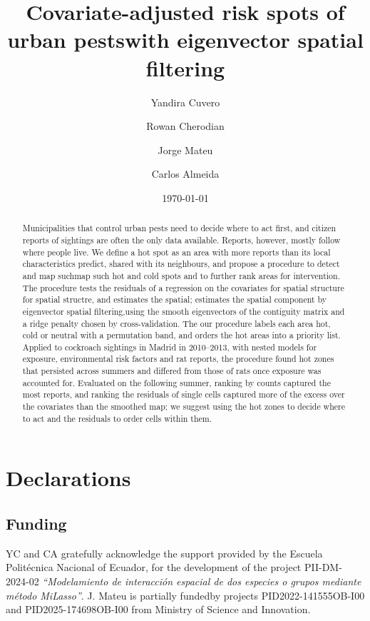 \documentclass[12pt, a4paper]{article}
\title{Covariate-adjusted risk spots of urban pestswith eigenvector spatial filtering}
\date{\today}
\author[1,2]{Yandira Cuvero}
\author[3]{Rowan Cherodian}
\author[1]{Jorge Mateu}
\author[2]{Carlos Almeida}
\affil[1]{Department of Mathematics, Universidad Jaume I, Castellón, Spain}
\affil[2]{Department of Mathematics, Escuela Politécnica Nacional, Quito, Ecuador}
\affil[3]{School of Medicine and Population Health, University of Sheffield, UK}
\begin{document}
\maketitle

\begin{abstract}
Municipalities that control urban pests need to decide where to act first, and citizen reports of sightings are often the only data available. Reports, however, mostly follow where people live. We define a hot spot as an area with more reports than its local characteristics predict, shared with its neighbours, and propose a procedure to detect and map suchmap such hot and cold spots and to further rank areas for intervention. The procedure tests the residuals of a regression on the covariates for spatial structure for spatial structre, and estimates the spatial; estimates the spatial component by eigenvector spatial filtering,using the smooth eigenvectors of the contiguity matrix and a ridge penalty chosen by cross-validation. The our procedure labels each area hot, cold or neutral with a permutation band, and orders the hot areas into a priority list. %
Applied to cockroach sightings in Madrid in 2010--2013, with nested models for exposure, environmental risk factors and rat reports, the procedure found hot zones that persisted across summers and differed from those of rats once exposure was accounted for. Evaluated on the following summer, ranking by counts captured the most reports, and ranking the residuals of single cells captured more of the excess over the covariates than the smoothed map; we suggest using the hot zones to decide where to act and the residuals to order cells within them.
\end{abstract}







\section*{Declarations}
\subsection*{Funding}
YC and CA gratefully acknowledge the support provided by the Escuela Politécnica Nacional of Ecuador, for the development of the project PII-DM-2024-02 \textit{``Modelamiento de interacción espacial de dos especies o grupos mediante método MiLasso''}. J. Mateu is partially fundedby projects PID2022-141555OB-I00 and PID2025-174698OB-I00 from Ministry of Science and Innovation.
\end{document}
